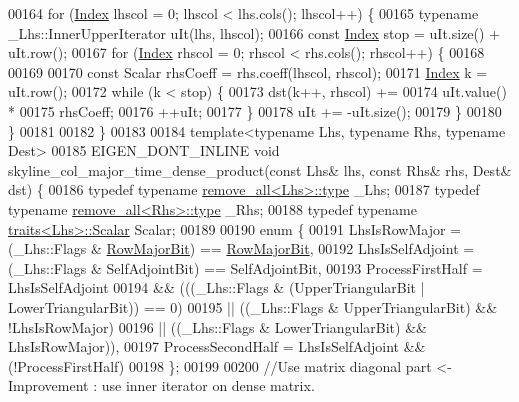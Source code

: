 \begin{DoxyCode}
00164     \textcolor{keywordflow}{for} (\hyperlink{namespace_eigen_a62e77e0933482dafde8fe197d9a2cfde}{Index} lhscol = 0; lhscol < lhs.cols(); lhscol++) \{
00165         \textcolor{keyword}{typename} \_Lhs::InnerUpperIterator uIt(lhs, lhscol);
00166         \textcolor{keyword}{const} \hyperlink{namespace_eigen_a62e77e0933482dafde8fe197d9a2cfde}{Index} stop = uIt.size() + uIt.row();
00167         \textcolor{keywordflow}{for} (\hyperlink{namespace_eigen_a62e77e0933482dafde8fe197d9a2cfde}{Index} rhscol = 0; rhscol < rhs.cols(); rhscol++) \{
00168 
00169 
00170             \textcolor{keyword}{const} Scalar rhsCoeff = rhs.coeff(lhscol, rhscol);
00171             \hyperlink{namespace_eigen_a62e77e0933482dafde8fe197d9a2cfde}{Index} k = uIt.row();
00172             \textcolor{keywordflow}{while} (k < stop) \{
00173                 dst(k++, rhscol) +=
00174                         uIt.value() *
00175                         rhsCoeff;
00176                 ++uIt;
00177             \}
00178             uIt += -uIt.size();
00179         \}
00180     \}
00181 
00182 \}
00183 
00184 \textcolor{keyword}{template}<\textcolor{keyword}{typename} Lhs, \textcolor{keyword}{typename} Rhs, \textcolor{keyword}{typename} Dest>
00185 EIGEN\_DONT\_INLINE \textcolor{keywordtype}{void} skyline\_col\_major\_time\_dense\_product(\textcolor{keyword}{const} Lhs& lhs, \textcolor{keyword}{const} Rhs& rhs, Dest& dst) \{
00186     \textcolor{keyword}{typedef} \textcolor{keyword}{typename} \hyperlink{group___sparse_core___module}{remove\_all<Lhs>::type} \_Lhs;
00187     \textcolor{keyword}{typedef} \textcolor{keyword}{typename} \hyperlink{group___sparse_core___module}{remove\_all<Rhs>::type} \_Rhs;
00188     \textcolor{keyword}{typedef} \textcolor{keyword}{typename} \hyperlink{struct_eigen_1_1internal_1_1traits}{traits<Lhs>::Scalar} Scalar;
00189 
00190     \textcolor{keyword}{enum} \{
00191         LhsIsRowMajor = (\_Lhs::Flags & \hyperlink{group__flags_gae4f56c2a60bbe4bd2e44c5b19cbe8762}{RowMajorBit}) == \hyperlink{group__flags_gae4f56c2a60bbe4bd2e44c5b19cbe8762}{RowMajorBit},
00192         LhsIsSelfAdjoint = (\_Lhs::Flags & SelfAdjointBit) == SelfAdjointBit,
00193         ProcessFirstHalf = LhsIsSelfAdjoint
00194         && (((\_Lhs::Flags & (UpperTriangularBit | LowerTriangularBit)) == 0)
00195         || ((\_Lhs::Flags & UpperTriangularBit) && !LhsIsRowMajor)
00196         || ((\_Lhs::Flags & LowerTriangularBit) && LhsIsRowMajor)),
00197         ProcessSecondHalf = LhsIsSelfAdjoint && (!ProcessFirstHalf)
00198     \};
00199 
00200     \textcolor{comment}{//Use matrix diagonal part <- Improvement : use inner iterator on dense matrix.}

\end{DoxyCode}

